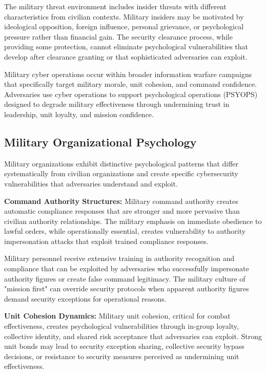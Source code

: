 \documentclass[10pt, twocolumn]{article}
\begin{document}
The military threat environment includes insider threats with different characteristics from civilian contexts. Military insiders may be motivated by ideological opposition, foreign influence, personal grievance, or psychological pressure rather than financial gain. The security clearance process, while providing some protection, cannot eliminate psychological vulnerabilities that develop after clearance granting or that sophisticated adversaries can exploit\cite{ncsc2024}.

Military cyber operations occur within broader information warfare campaigns that specifically target military morale, unit cohesion, and command confidence. Adversaries use cyber operations to support psychological operations (PSYOPS) designed to degrade military effectiveness through undermining trust in leadership, unit loyalty, and mission confidence.

\subsection{Military Organizational Psychology}

Military organizations exhibit distinctive psychological patterns that differ systematically from civilian organizations and create specific cybersecurity vulnerabilities that adversaries understand and exploit.

\textbf{Command Authority Structures:} Military command authority creates automatic compliance responses that are stronger and more pervasive than civilian authority relationships. The military emphasis on immediate obedience to lawful orders, while operationally essential, creates vulnerability to authority impersonation attacks that exploit trained compliance responses.

Military personnel receive extensive training in authority recognition and compliance that can be exploited by adversaries who successfully impersonate authority figures or create false command legitimacy. The military culture of "mission first" can override security protocols when apparent authority figures demand security exceptions for operational reasons.

\textbf{Unit Cohesion Dynamics:} Military unit cohesion, critical for combat effectiveness, creates psychological vulnerabilities through in-group loyalty, collective identity, and shared risk acceptance that adversaries can exploit. Strong unit bonds may lead to security exception sharing, collective security bypass decisions, or resistance to security measures perceived as undermining unit effectiveness.
\end{document}
